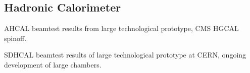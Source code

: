 \subsection{Hadronic Calorimeter}
AHCAL beamtest results from large technological prototype, CMS HGCAL spinoff.

SDHCAL beamtest results of large technological prototype at CERN, ongoing development of large chambers. 

\vspace{2cm}